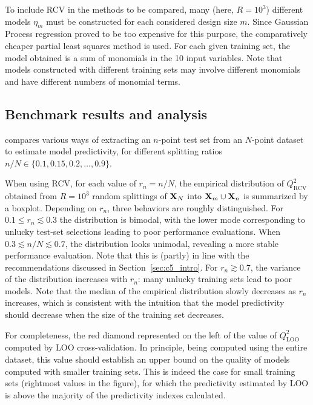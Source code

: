 To include RCV in the methods to be compared, many (here, $R=10^3$) different models $\eta_m$ must be constructed for each considered design size $m$. 
Since Gaussian Process regression proved to be too expensive for this purpose, the comparatively cheaper partial least squares method \citep{wolsjo01} is used. 
For each given training set, the model obtained is a sum of monomials in the 10 input variables. 
Note that models constructed with different training sets may involve different monomials and have different numbers of monomial terms. 


\subsection{Benchmark results and analysis}

 compares various ways of extracting an $n$-point test set from an $N$-point dataset to estimate model predictivity, for different splitting ratios $n/N\in\{0.1,0.15,0.2,\ldots,0.9\}$. 

When using RCV, for each value of $r_n=n/N$, the empirical distribution of $Q^2_{\mathrm{RCV}}$ obtained from $R=10^3$ random splittings of ${\bf X}_N$ into ${\bf X}_m\cup{\bf X}_n$ is summarized by a boxplot. 
Depending on $r_n$, three behaviors are roughly distinguished. 
For $0.1 \leq r_n \lesssim 0.3$ the distribution is bimodal, with the lower mode corresponding to unlucky test-set selections leading to poor performance evaluations. 
When $0.3 \lesssim n/N \lesssim 0.7$, the distribution looks unimodal, revealing a more stable performance evaluation. 
Note that this is (partly) in line with the recommendations discussed in Section~\ref{sec:c5_intro}. 
For $r_n \gtrsim 0.7$, the variance of the distribution increases with $r_n$: many unlucky training sets lead to poor models. 
Note that the median of the empirical distribution slowly decreases as $r_n$ increases, which is consistent with the intuition that the model predictivity should decrease when the size of the training set decreases. 

For completeness, the red diamond represented on the left of  the value of $Q^2_{\mathrm{LOO}}$ computed by LOO cross-validation. 
In principle, being computed using the entire dataset, this value should establish an upper bound on the quality of models computed with smaller training sets. 
This is indeed the case for small training sets (rightmost values in the figure), for which the predictivity estimated by LOO is above the majority of the predictivity indexes calculated. 

